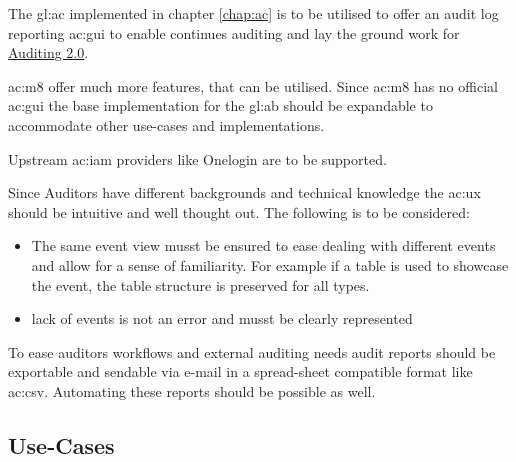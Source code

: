 

The \gls{gl:ac} implemented in chapter \ref{chap:ac} is to be utilised to offer an audit log reporting \gls{ac:gui} to enable continues auditing and lay the ground work for \hyperref[sec:adt2]{Auditing 2.0}.

\Gls{ac:m8} offer much more features, that can be utilised. Since \gls{ac:m8} has no official \gls{ac:gui} the base implementation for the \gls{gl:ab} should be expandable to accommodate other use-cases and implementations.

Upstream \gls{ac:iam} providers like Onelogin are to be supported.

Since Auditors have different backgrounds and technical knowledge the \gls{ac:ux} should be intuitive and well thought out. The following is to be considered:

\begin{itemize}
  \item The same event view musst be ensured to ease dealing with different events and allow for a sense of familiarity. For example if a table is used to showcase the event, the table structure is preserved for all types.
  \item lack of events is not an error and musst be clearly represented
\end{itemize}

To ease auditors workflows and external auditing needs audit reports should be exportable and sendable via e-mail in a spread-sheet compatible format like \gls{ac:csv}. Automating these reports should be possible as well. 

\subsection{Use-Cases}


